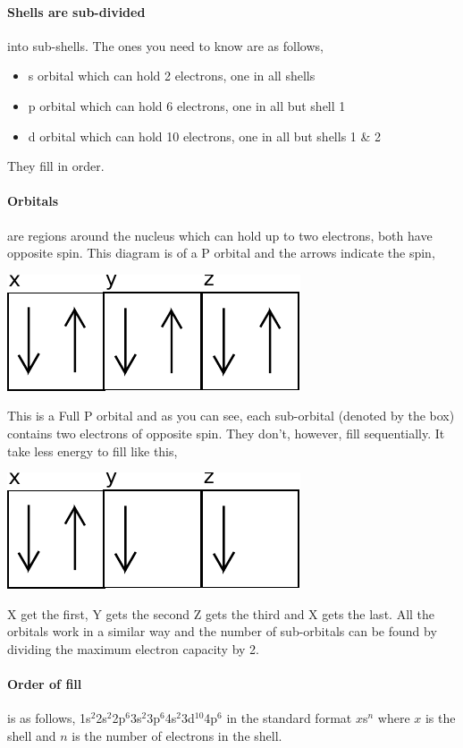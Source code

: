 	\paragraph{Shells are sub-divided} into sub-shells. The ones you need to know are as follows,
	\begin{itemize}
		\item s orbital which can hold 2 electrons, one in all shells
		\item p orbital which can hold 6 electrons, one in all but shell 1
		\item d orbital which can hold 10 electrons, one in all but shells 1 \& 2
	\end{itemize}
	They fill in order.
	
	\paragraph{Orbitals} are regions around the nucleus which can hold up to two electrons, both have opposite spin. This diagram is of a P orbital and the arrows indicate the spin,
	\begin{center}
		\includegraphics{Porbital}
	\end{center}
	This is a Full P orbital and as you can see, each sub-orbital (denoted by the box) contains two electrons of opposite spin. They don't, however, fill sequentially. It take less energy to fill like this,
	\begin{center}
		\includegraphics{P4orbital}
	\end{center}
	X get the first, Y gets the second Z gets the third and X gets the last. All the orbitals work in a similar way and the number of sub-orbitals can be found by dividing the maximum electron capacity by 2.
	
	\paragraph{Order of fill} is as follows, 1s$^2$2s$^2$2p$^6$3s$^2$3p$^6$4s$^2$3d$^{10}$4p$^6$ in the standard format $x$s$^n$ where $x$ is the shell and $n$ is the number of electrons in the shell.
	
